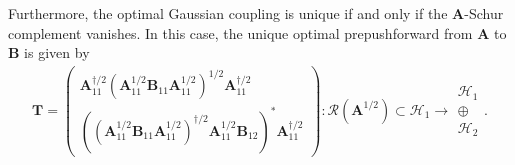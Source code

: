 \documentclass[noinfoline]{imsart}\setcounter{tocdepth}{2}
\newcommand{\m}[1]{\mathbf{#1}}
\renewcommand{\c}[1]{\mathcal{#1}}
\theoremstyle{plain}
\begin{document}
Furthermore, the optimal Gaussian coupling is unique if and only if the $\m{A}$-Schur complement vanishes. 
In this case, the unique optimal prepushforward from $\m{A}$ to $\m{B}$ is given by
\begin{align*}
    \m{T} =
    \begin{pmatrix}
    \m{A}_{{11}}^{\dagger/2} (\m{A}_{{11}}^{1/2} \m{B}_{{11}} \m{A}_{{11}}^{1/2})^{1/2} \m{A}_{{11}}^{\dagger/2} \\
    ((\m{A}_{{11}}^{1/2} \m{B}_{{11}} \m{A}_{{11}}^{1/2})^{\dagger/2} \m{A}_{{11}}^{1/2} \m{B}_{{12}})^{*} \m{A}_{{11}}^{\dagger/2}
    \end{pmatrix}
        :
    \c{R}(\m{A}^{1/2}) \subset \c{H}_{1}
    \rightarrow
    \begin{array}{c}
    \c{H}_{1} \\
    \oplus \\
    \c{H}_{2}
    \end{array}.
\end{align*}
\end{document}
